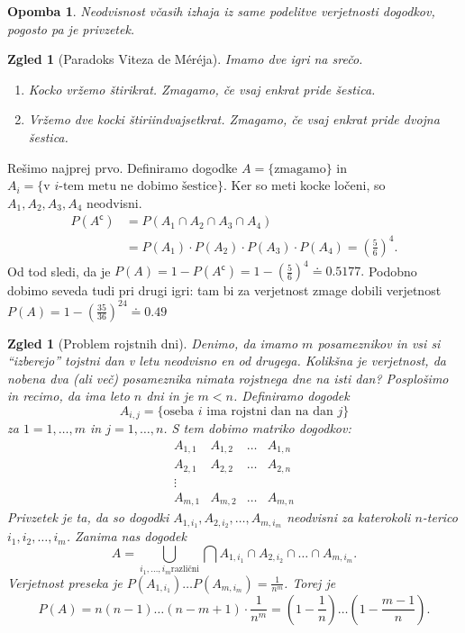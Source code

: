\documentclass[10pt, a4paper]{article}
\newtheorem*{opomba}{Opomba}
\newtheorem{zgled}[izr]{Zgled}
\newcommand{\stcomp}[1]{{#1}^{\mathsf{c}}}
\begin{document}
\begin{opomba}
  Neodvisnost včasih izhaja iz same podelitve verjetnosti dogodkov, pogosto 
  pa je privzetek.
\end{opomba}

\begin{zgled}[Paradoks Viteza de Méréja]
    Imamo dve igri na srečo. 
    \begin{enumerate}
      \item Kocko vržemo štirikrat.
    Zmagamo, če vsaj enkrat pride šestica.
      \item Vržemo dve kocki štiriindvajsetkrat. Zmagamo, če vsaj enkrat pride dvojna šestica. 
    \end{enumerate}
\end{zgled}

Rešimo najprej prvo. Definiramo dogodke $A = \{\text{zmagamo}\}$ in $A_i = \{\text{v $i$-tem metu ne dobimo šestice}\}$.
Ker so meti kocke ločeni, so $A_1, A_2, A_3, A_4$ neodvisni.
\begin{align*}
  P(\stcomp{A}) &= P(A_1 \cap A_2 \cap A_3 \cap A_4) \\
  &= P(A_1) \cdot P(A_2) \cdot P(A_3) \cdot P(A_4) = \left(\frac{5}{6}\right)^4.
\end{align*}
Od tod sledi, da je $P(A) = 1 - P(\stcomp{A}) = 1 - \left(\frac{5}{6}\right)^4 \doteq 0.5177.$ 
Podobno dobimo seveda tudi pri drugi igri: tam bi za verjetnost zmage dobili verjetnost 
$P(A) = 1 - \left(\frac{35}{36}\right)^{24} \doteq 0.49$

\begin{zgled}[Problem rojstnih dni]
  Denimo, da imamo $m$ posameznikov in vsi si "`izberejo"' tojstni dan v letu neodvisno en od drugega.
  Kolikšna je verjetnost, da nobena dva (ali več) posameznika nimata rojstnega dne na isti dan?
  Posplošimo in recimo, da ima leto $n$ dni in je $m < n$. Definiramo dogodek 
  $$A_{i, j} = \{\text{oseba $i$ ima rojstni dan na dan $j$}\}$$
  za $1 = 1, \dots, m$ in $j = 1, \dots, n$. S tem dobimo matriko dogodkov:
  $$
  \begin{matrix}
    A_{1, 1} & A_{1, 2} & \dots & A_{1, n}\\
    A_{2, 1} & A_{2, 2} & \dots & A_{2, n}\\
    \vdots & & & \\
    A_{m, 1} & A_{m, 2} & \dots & A_{m, n}
  \end{matrix}
  $$
  Privzetek je ta, da so dogodki $A_{1, i_1}, A_{2, i_2}, \dots, A_{m, {i_m}}$
  neodvisni za katerokoli $n$-terico $i_1, i_2, \dots, i_m$.
  Zanima nas dogodek 
  $$A = \bigcup_{i_1, \dots, i_m \textrm{različni}} \bigcap A_{1, i_1} \cap A_{2, i_2} \cap \dots \cap A_{m, i_m}.$$
  Verjetnost preseka je $P(A_{1, i_1}) \dots P(A_{m, i_m}) = \frac{1}{n^m}$.
  Torej je 
  $$P(A) = n (n - 1) \dots (n - m + 1) \cdot \frac{1}{n^m} = \left(1 - \frac{1}{n}\right) \dots \left(1 - \frac{m - 1}{n}\right).$$
\end{zgled}
\end{document}
